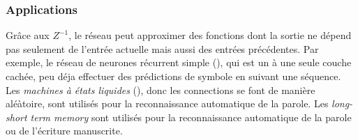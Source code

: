 \subsubsection*{Applications}
Grâce aux  $Z^{-1}$, le réseau peut approximer des fonctions dont la sortie ne dépend pas seulement de l'entrée actuelle mais aussi des entrées précédentes.
Par exemple, le réseau de neurones récurrent simple (\srn), qui est un \rmlp à une seule couche cachée, peu déja effectuer des prédictions de symbole en suivant une séquence.
Les \emph{machines à états liquides} (\lsm), donc les connections se font de manière aléàtoire, sont utilisés pour la reconnaissance automatique de la parole. %
Les \emph{long-short term memory} sont utilisés pour la reconnaissance automatique de la parole ou de l'écriture manuscrite. %
